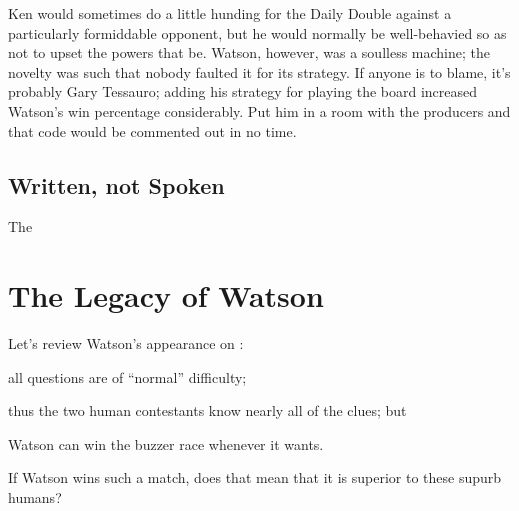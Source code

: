Ken would sometimes do a little hunding for the Daily Double against a particularly formiddable opponent, but he would normally be well-behavied so as not to upset the powers that be.
%
Watson, however, was a soulless machine; the novelty was such that nobody faulted it for its strategy.
%
If anyone is to blame, it's probably Gary Tessauro; adding his strategy for playing the board increased Watson's win percentage considerably.
%
Put him in a room with the \jeopardy{} producers and that code would be commented out in no time.

\subsection{Written, not Spoken}

The 

\section{The Legacy of Watson}

Let's review Watson's appearance on \jeopardyp{}:
\begin{enumerate*}
        \item all questions are of ``normal'' difficulty;
        \item thus the two human contestants know nearly all of the clues; but
        \item Watson can win the buzzer race whenever it wants.
\end{enumerate*}
If Watson wins such a match, does that mean that it is superior to
these supurb humans?